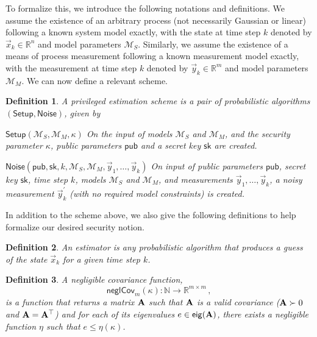 \documentclass[letterpaper, 10 pt, conference]{ieeeconf}
\newtheorem{definition}{Definition}[section]
\begin{document}
To formalize this, we introduce the following notations and definitions. We assume the existence of an arbitrary process (not necessarily Gaussian or linear) following a known system model exactly, with the state at time step $k$ denoted by $\vec{x}_k\in\mathbb{R}^n$ and model parameters $\mathcal{M}_S$. Similarly, we assume the existence of a means of process measurement following a known measurement model exactly, with the measurement at time step $k$ denoted by $\vec{y}_k\in\mathbb{R}^m$ and model parameters $\mathcal{M}_M$. We can now define a relevant scheme.
\begin{definition}
   A \textit{privileged estimation scheme} is a pair of probabilistic algorithms $(\mathsf{Setup},\mathsf{Noise})$, given by
   \begin{LaTeXdescription}
      \item[$\mathsf{Setup}(\mathcal{M}_S, \mathcal{M}_M, \kappa)$] On the input of models $\mathcal{M}_S$ and $\mathcal{M}_M$, and the security parameter $\kappa$, public parameters $\mathsf{pub}$ and a secret key $\mathsf{sk}$ are created.
      \item[$\mathsf{Noise}(\mathsf{pub}, \mathsf{sk}, k, \mathcal{M}_S, \mathcal{M}_M, \vec{y}_1, \dots, \vec{y}_k)$] On input of public parameters $\mathsf{pub}$, secret key $\mathsf{sk}$, time step $k$, models $\mathcal{M}_S$ and $\mathcal{M}_M$, and measurements $\vec{y}_1,\dots,\vec{y}_k$, a noisy measurement $\vec{y}^\prime_k$ (with no required model constraints) is created.
   \end{LaTeXdescription}
\end{definition}
In addition to the scheme above, we also give the following definitions to help formalize our desired security notion.
\begin{definition}\label{def:estimator}
   An \textit{estimator} is any probabilistic algorithm that produces a guess of the state $\vec{x}_k$ for a given time step $k$.
\end{definition}
\begin{definition}
   A \textit{negligible covariance function},
   \begin{equation}
      \mathsf{neglCov}_m(\kappa):\mathbb{N}\rightarrow \mathbb{R}^{m\times m}\,,
   \end{equation}
   is a function that returns a matrix ${{\mathbf{A}}}$ such that ${{\mathbf{A}}}$ is a valid covariance (${{\mathbf{A}}}\succ 0$ and ${{\mathbf{A}}}={{\mathbf{A}}}^\top$) and for each of its eigenvalues $e\in\mathsf{eig}({{\mathbf{A}}})$, there exists a negligible function \cite[Def. 3.4]{katzIntroductionModernCryptography2008} $\eta$ such that $e\leq\eta(\kappa)$.
\end{definition}
\end{document}

